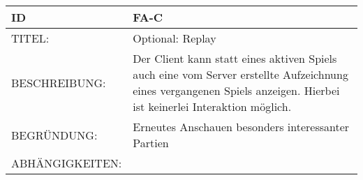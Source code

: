 \begin{tabularx}{16cm}{l|X}
\textbf{ID} & \textbf{FA-C} \\
\hline
TITEL: & Optional: Replay \\
\hline 
BESCHREIBUNG: & Der Client kann statt eines aktiven Spiels auch eine vom Server erstellte Aufzeichnung eines vergangenen Spiels anzeigen. Hierbei ist keinerlei Interaktion möglich. \\
\hline
BEGRÜNDUNG: & Erneutes Anschauen besonders interessanter Partien \\
\hline
ABHÄNGIGKEITEN: & \\
\end{tabularx}
